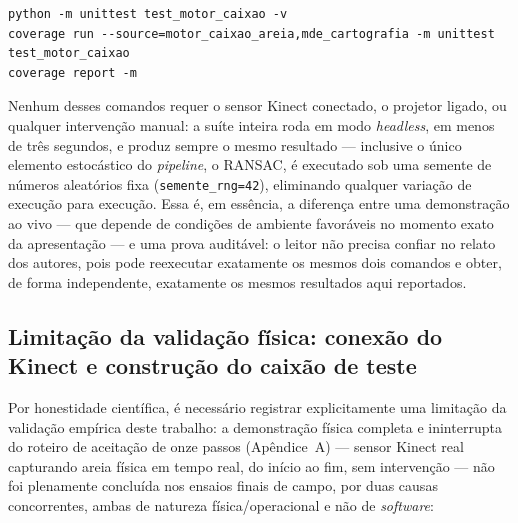 \begin{lstlisting}
python -m unittest test_motor_caixao -v
coverage run --source=motor_caixao_areia,mde_cartografia -m unittest test_motor_caixao
coverage report -m
\end{lstlisting}

\noindent Nenhum desses comandos requer o sensor Kinect conectado, o
projetor ligado, ou qualquer intervenção manual: a suíte inteira roda
em modo \textit{headless}, em menos de três segundos, e produz sempre
o mesmo resultado — inclusive o único elemento estocástico do
\textit{pipeline}, o RANSAC, é executado sob uma semente de números
aleatórios fixa (\texttt{semente\_rng=42}), eliminando qualquer
variação de execução para execução. Essa é, em essência, a diferença
entre uma demonstração ao vivo — que depende de condições de ambiente
favoráveis no momento exato da apresentação — e uma prova auditável:
o leitor não precisa confiar no relato dos autores, pois pode
reexecutar exatamente os mesmos dois comandos e obter, de forma
independente, exatamente os mesmos resultados aqui reportados.

\subsection{Limitação da validação física: conexão do Kinect e construção do caixão de teste}
\label{subsec:limitacao-fisica}

Por honestidade científica, é necessário registrar explicitamente uma
limitação da validação empírica deste trabalho: a demonstração física
completa e ininterrupta do roteiro de aceitação de onze passos
(Apêndice~A) — sensor Kinect real capturando areia física em tempo
real, do início ao fim, sem intervenção — não foi plenamente concluída
nos ensaios finais de campo, por duas causas concorrentes, ambas de
natureza física/operacional e não de \textit{software}:

